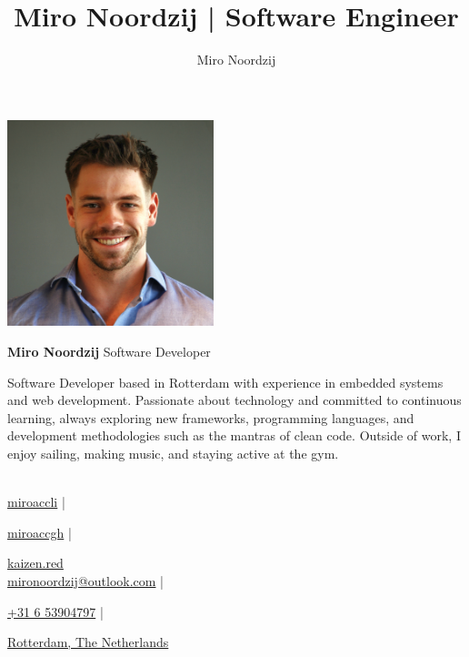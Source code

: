 \documentclass[11pt, twoside, a4paper, titlepage]{article}
\author{Miro Noordzij}
\title{Miro Noordzij | Software Engineer}
\begin{document}
\begin{tcolorbox}[boxsep=0mm, left=0mm, right=0mm, top=0mm, bottom=0mm]
	\begin{minipage}{6cm}
		\includegraphics[width=6cm, height=6cm ]{avatar.jpg}
	\end{minipage}
	\begin{minipage}{14.8cm}
		\begin{center}
			\Huge
			\textbf{Miro Noordzij}  Software Developer
			\vspace*{0.3cm}\\
			\small
			\parbox{14cm}{Software Developer based in Rotterdam with experience in embedded systems and web development. Passionate about technology and committed to continuous learning, always exploring new frameworks, programming languages, and development methodologies such as the mantras of clean code. Outside of work, I enjoy sailing, making music, and staying active at the gym.}
			\vspace*{0.3cm}\\
			
			\href{https://www.linkedin.com/in/miroaccli}{miroaccli} |
			
			\href{https://www.github.com/miroaccgh}{miroaccgh} |
			
			\href{https://www.kaizen.red}{kaizen.red} \\
			
			\href{mailto:mironoordzij@outlook.com}{mironoordzij@outlook.com} |
			
			\href{tel:+31653904797}{+31 6 53904797} |
			
			\href{https://g.co/kgs/Ak21VtP}{Rotterdam, The Netherlands}
		\end{center}
	\end{minipage}
\end{tcolorbox}
\end{document}
